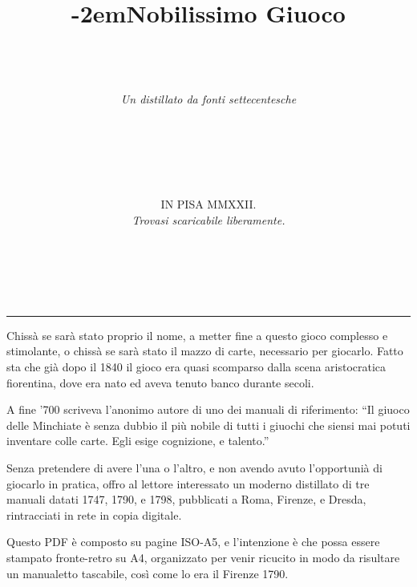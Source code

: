 \documentclass[11pt,a6paper]{article}
\title{\kern -2em\fontshape{sc}\LARGE Nobilissimo Giuoco\\ \normalsize \textls[1000]{delle}\\ \fontsize{34}{34}\selectfont{\textls[100]{MINCHIATE}}}
\author{%
  \vspace{-26pt}\\
\textit{Un distillato da fonti settecentesche}\\
\vspace{14pt}\\
\fontshape{sc}\fontsize{10}{34}\selectfont{\textls[350]{termini, regole}}\\
\vspace{24pt}\\
\fontshape{sc}\fontsize{10}{34}\selectfont{\textls[30]{e la giusta dose di}}\\
\fontshape{sc}\fontsize{18}{34}\selectfont{\textls[300]{poesia}}\\
\fontshape{sc}\fontsize{10}{34}\selectfont{\textls[90]{dell'epoca}}}
\date{%
  \vfill\small IN PISA MMXXII.\\ \sepline
  \textit{Trovasi scaricabile liberamente.}}
\newcommand{\supersection}[1]{%
\clearpage
    {\scshape \centering \huge #1\\}
    \vspace{6pt}
    \hrule
    \vspace{12pt}
}
\begin{document}
\renewcommand{\refname}{X\hfill{\large\mdseries\slshape Bibliografia}}


\maketitle

\supersection{\\ \textls[320]{Minchiate}}

\noindent Chissà se sarà stato proprio il nome, a metter fine a questo gioco complesso
e stimolante, o chissà se sarà stato il mazzo di carte, necessario per
giocarlo.  Fatto sta che già dopo il 1840 il gioco era quasi scomparso dalla
scena aristocratica fiorentina, dove era nato ed aveva tenuto banco durante
secoli.

A fine '700 scriveva l'anonimo autore di uno dei manuali di riferimento:
``Il giuoco delle Minchiate è senza dubbio il più nobile di tutti i giuochi
che siensi mai potuti inventare colle carte.  Egli esige cognizione, e
talento.''

Senza pretendere di avere l'una o l'altro, e non avendo avuto l'opportunià
di giocarlo in pratica, offro al lettore interessato un moderno distillato
di tre manuali datati 1747, 1790, e 1798, pubblicati a Roma, Firenze, e
Dresda, rintracciati in rete in copia digitale.

Questo PDF è composto su pagine ISO-A5, e l'intenzione è che possa
essere stampato fronte-retro su A4,  organizzato per venir ricucito in
modo da risultare un manualetto tascabile, così come lo era il Firenze 1790.
\end{document}
